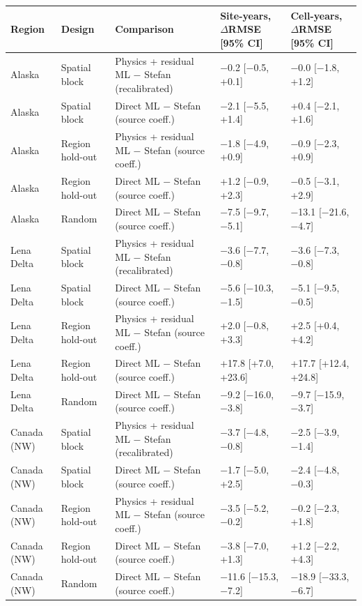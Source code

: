 \setlength{\tabcolsep}{3.5pt}\begin{tabular}{@{}lllll@{}}
\toprule
Region & Design & Comparison & Site-years, $\Delta$RMSE [95\% CI] & Cell-years, $\Delta$RMSE [95\% CI] \\
\midrule
Alaska & Spatial block & Physics + residual ML − Stefan (recalibrated) & −0.2 [−0.5, +0.1] & −0.0 [−1.8, +1.2] \\
Alaska & Spatial block & Direct ML − Stefan (source coeff.) & −2.1 [−5.5, +1.4] & +0.4 [−2.1, +1.6] \\
Alaska & Region hold-out & Physics + residual ML − Stefan (source coeff.) & −1.8 [−4.9, +0.9] & −0.9 [−2.3, +0.9] \\
Alaska & Region hold-out & Direct ML − Stefan (source coeff.) & +1.2 [−0.9, +2.3] & −0.5 [−3.1, +2.9] \\
Alaska & Random & Direct ML − Stefan (source coeff.) & −7.5 [−9.7, −5.1] & −13.1 [−21.6, −4.7] \\
Lena Delta & Spatial block & Physics + residual ML − Stefan (recalibrated) & −3.6 [−7.7, −0.8] & −3.6 [−7.3, −0.8] \\
Lena Delta & Spatial block & Direct ML − Stefan (source coeff.) & −5.6 [−10.3, −1.5] & −5.1 [−9.5, −0.5] \\
Lena Delta & Region hold-out & Physics + residual ML − Stefan (source coeff.) & +2.0 [−0.8, +3.3] & +2.5 [+0.4, +4.2] \\
Lena Delta & Region hold-out & Direct ML − Stefan (source coeff.) & +17.8 [+7.0, +23.6] & +17.7 [+12.4, +24.8] \\
Lena Delta & Random & Direct ML − Stefan (source coeff.) & −9.2 [−16.0, −3.8] & −9.7 [−15.9, −3.7] \\
Canada (NW) & Spatial block & Physics + residual ML − Stefan (recalibrated) & −3.7 [−4.8, −0.8] & −2.5 [−3.9, −1.4] \\
Canada (NW) & Spatial block & Direct ML − Stefan (source coeff.) & −1.7 [−5.0, +2.5] & −2.4 [−4.8, −0.3] \\
Canada (NW) & Region hold-out & Physics + residual ML − Stefan (source coeff.) & −3.5 [−5.2, −0.2] & −0.2 [−2.3, +1.8] \\
Canada (NW) & Region hold-out & Direct ML − Stefan (source coeff.) & −3.8 [−7.0, +1.3] & +1.2 [−2.2, +4.3] \\
Canada (NW) & Random & Direct ML − Stefan (source coeff.) & −11.6 [−15.3, −7.2] & −18.9 [−33.3, −6.7] \\
\bottomrule
\end{tabular}
